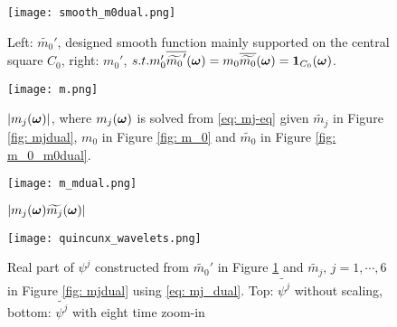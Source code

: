 \begin{figure}
\centering
\texttt{[image: smooth\_m0dual.png]}
\caption{ Left: $\widetilde{m_0}'$, designed smooth function mainly supported on the central square $C_0$, right: $m_0'$, $s.t. m_0'\overline{\widetilde{m_0}'}(\boldsymbol{\omega})  =  m_0\overline{\widetilde{m_0}}(\boldsymbol{\omega})= \boldsymbol{1}_{C_0}(\boldsymbol{\omega})$. } 
\label{fig: smooth_m0dual}
\end{figure}

\begin{figure}
\centering
\texttt{[image: m.png]}
\caption{ $|m_j(\boldsymbol{\omega})|$, where $m_j(\boldsymbol{\omega})$ is solved from \eqref{eq: mj-eq} given $\widetilde{m_j}$ in Figure \ref{fig: mjdual}, $m_0$ in Figure \ref{fig: m_0} and $\widetilde{m_0}$ in Figure \ref{fig: m_0_m0dual}. }
\label{fig: m_j}
\end{figure}

\begin{figure}
\centering
\texttt{[image: m\_mdual.png]}
\caption{ $|m_j(\boldsymbol{\omega})\widetilde{m_{j}}(\boldsymbol{\omega})|$ }
\label{fig: m_j_mjdual}
\end{figure}

\begin{figure}
\centering
\texttt{[image: quincunx\_wavelets.png]}
\caption{ Real part of $\psi^j$ constructed from $\widetilde{m_0}'$ in Figure \ref{fig: smooth_m0dual} and $\widetilde{m_j},\, j=1,\cdots, 6$ in Figure \ref{fig: mjdual} using \eqref{eq: mj_dual}. Top: $\widetilde{\psi^j}$ without scaling, bottom: $\widetilde{\psi^j}$ with eight time zoom-in } 
\label{fig: wavelets}
\end{figure}


